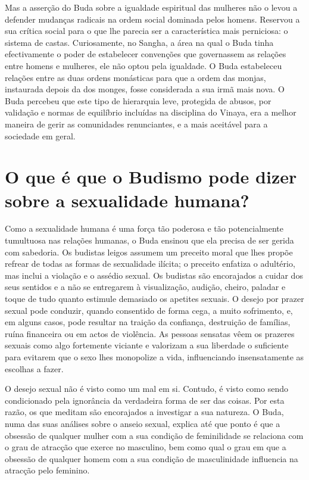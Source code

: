 Mas a asserção do Buda sobre a igualdade espiritual das mulheres não o
levou a defender mudanças radicais na ordem social dominada pelos
homens. Reservou a sua crítica social para o que lhe parecia ser a
característica mais perniciosa: o sistema de castas. Curiosamente, no
Sangha, a área na qual o Buda tinha efectivamente o poder de estabelecer
convenções que governassem as relações entre homens e mulheres, ele não
optou pela igualdade. O Buda estabeleceu relações entre as duas ordens
monásticas para que a ordem das monjas, instaurada depois da dos monges,
fosse considerada a sua irmã mais nova. O Buda percebeu que este tipo de
hierarquia leve, protegida de abusos, por validação e normas de
equilíbrio incluídas na disciplina do Vinaya, era a melhor maneira de
gerir as comunidades renunciantes, e a mais aceitável para a sociedade
em geral.

\section{O que é que o Budismo pode dizer sobre a sexualidade humana?}

\enlargethispage{\baselineskip}

Como a sexualidade humana é uma força tão poderosa e tão potencialmente
tumultuosa nas relações humanas, o Buda ensinou que ela precisa de ser
gerida com sabedoria. Os budistas leigos assumem um preceito moral que
lhes propõe refrear de todas as formas de sexualidade ilícita; o
preceito enfatiza o adultério, mas inclui a violação e o assédio sexual.
Os budistas são encorajados a cuidar dos seus sentidos e a não se
entregarem à visualização, audição, cheiro, paladar e toque de tudo
quanto estimule demasiado os apetites sexuais. O desejo por prazer
sexual pode conduzir, quando consentido de forma cega, a muito
sofrimento, e, em alguns casos, pode resultar na traição da confiança,
destruição de famílias, ruína financeira ou em actos de violência. As
pessoas sensatas vêem os prazeres sexuais como algo fortemente viciante
e valorizam a sua liberdade o suficiente para evitarem que o sexo lhes
monopolize a vida, influenciando insensatamente as escolhas a fazer.

O desejo sexual não é visto como um mal em si. Contudo, é visto como
sendo condicionado pela ignorância da verdadeira forma de ser das
coisas. Por esta razão, os que meditam são encorajados a investigar a
sua natureza. O Buda, numa das suas análises sobre o anseio sexual,
explica até que ponto é que a obsessão de qualquer mulher com a sua
condição de feminilidade se relaciona com o grau de atracção que exerce
no masculino, bem como qual o grau em que a obsessão de qualquer homem
com a sua condição de masculinidade influencia na atracção pelo
feminino.

